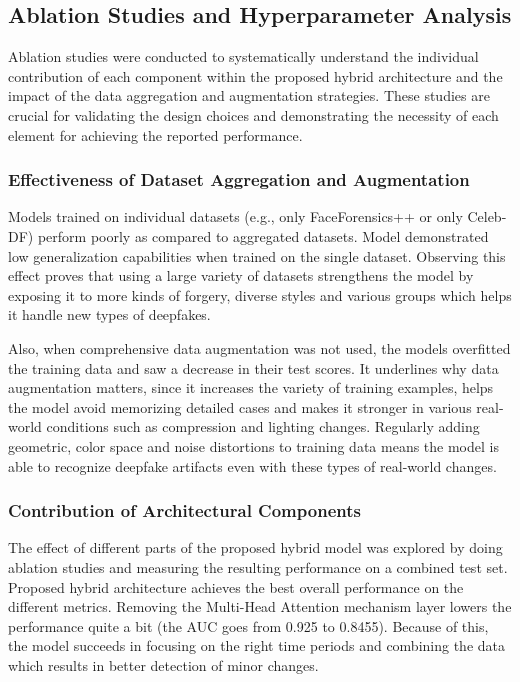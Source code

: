 \documentclass[conference]{IEEEtran}
\begin{document}
\subsection{Ablation Studies and Hyperparameter Analysis}
Ablation studies were conducted to systematically understand the individual contribution of each component within the proposed hybrid architecture and the impact of the data aggregation and augmentation strategies. These studies are crucial for validating the design choices and demonstrating the necessity of each element for achieving the reported performance.

\subsubsection{Effectiveness of Dataset Aggregation and Augmentation}
Models trained on individual datasets (e.g., only FaceForensics++ or only Celeb-DF) perform poorly as compared to aggregated datasets. Model demonstrated low generalization capabilities when trained on the single dataset. Observing this effect proves that using a large variety of datasets strengthens the model by exposing it to more kinds of forgery, diverse styles and various groups which helps it handle new types of deepfakes.

Also, when comprehensive data augmentation was not used, the models overfitted the training data and saw a decrease in their test scores. It underlines why data augmentation matters, since it increases the variety of training examples, helps the model avoid memorizing detailed cases and makes it stronger in various real-world conditions such as compression and lighting changes. Regularly adding geometric, color space and noise distortions to training data means the model is able to recognize deepfake artifacts even with these types of real-world changes.

\subsubsection{Contribution of Architectural Components}

The effect of different parts of the proposed hybrid model was explored by doing ablation studies and measuring the resulting performance on a combined test set. Proposed hybrid architecture achieves the best overall performance on the different metrics. Removing the Multi-Head Attention mechanism layer lowers the performance quite a bit (the AUC goes from 0.925 to 0.8455). Because of this, the model succeeds in focusing on the right time periods and combining the data which results in better detection of minor changes.
\end{document}
